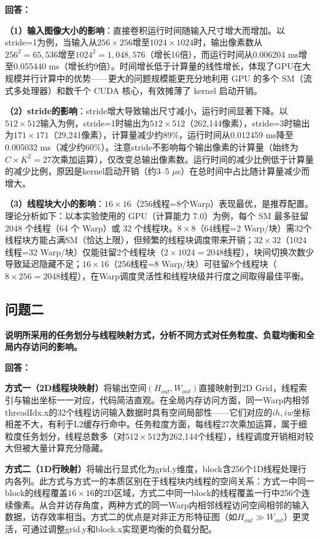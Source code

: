 \documentclass{SYSUReport}
\begin{document}
\textbf{回答：}

\textbf{（1）输入图像大小的影响}：直接卷积运行时间随输入尺寸增大而增加。以stride=1为例，当输入从$256\times256$增至$1024\times1024$时，输出像素数从$256^2=65,536$增至$1024^2=1,048,576$（增长16倍），而运行时间从0.006204 ms增至0.055440 ms（增长约9倍）。时间增长低于计算量的线性增长，体现了GPU在大规模并行计算中的优势——更大的问题规模能更充分地利用 GPU 的多个 SM（流式多处理器）和数千个 CUDA 核心，有效摊薄了 kernel 启动开销。

\textbf{（2）stride的影响}：stride增大导致输出尺寸减小，运行时间显著下降。以$512\times512$输入为例，stride=1时输出为$512\times512$（262,144像素），stride=3时输出为$171\times171$（29,241像素），计算量减少约89\%，运行时间从0.012459 ms降至0.005032 ms（减少约60\%）。注意stride不影响每个输出像素的计算量（始终为$C\times K^2=27$次乘加运算），仅改变总输出像素数。运行时间的减少比例低于计算量的减少比例，原因是kernel启动开销（约3--5 $\mu$s）在总时间中占比随计算量减少而增大。

\textbf{（3）线程块大小的影响}：$16\times16$（256线程=8个Warp）表现最优，是推荐配置。理论分析如下：以本实验使用的 GPU（计算能力 7.0）为例，每个 SM 最多驻留 2048 个线程（64 个 Warp）或 32 个线程块。$8\times8$（64线程=2 Warp/块）需32个线程块方能占满SM（恰达上限），但频繁的线程块调度带来开销；$32\times32$（1024线程=32 Warp/块）仅能驻留2个线程块（$2\times1024=2048$线程），块间切换次数少导致延迟隐藏不足；$16\times16$（256线程=8 Warp/块）可驻留8个线程块（$8\times256=2048$线程），在Warp调度灵活性和线程块级并行度之间取得最佳平衡。

\subsection{问题二}

\textbf{说明所采用的任务划分与线程映射方式，分析不同方式对任务粒度、负载均衡和全局内存访问的影响。}

\textbf{回答：}

\textbf{方式一（2D线程块映射）}将输出空间$(H_{out},W_{out})$直接映射到2D Grid，线程索引与输出坐标一一对应，代码简洁直观。在全局内存访问方面，同一Warp内相邻threadIdx.x的32个线程访问输入数据时具有空间局部性——它们对应的$ih,iw$坐标相差不大，有利于L2缓存行命中。任务粒度方面，每线程27次乘加运算，属于细粒度任务划分，线程总数多（对$512\times512$为262,144个线程），线程调度开销相对较大但被大量计算充分隐藏。

\textbf{方式二（1D行映射）}将输出行显式化为grid.y维度，block含256个1D线程处理行内各列。此方式与方式一的本质区别在于线程块内线程的空间关系：方式一中同一block的线程覆盖$16\times16$的2D区域，方式二中同一block的线程覆盖一行中256个连续像素。从合并访存角度，两种方式的同一Warp内相邻线程访问空间相邻的输入数据，访存效率相当。方式二的优点是对非正方形特征图（如$H_{out}\gg W_{out}$）更灵活，可通过调整grid.y和block.x实现更均衡的负载分配。
\end{document}
